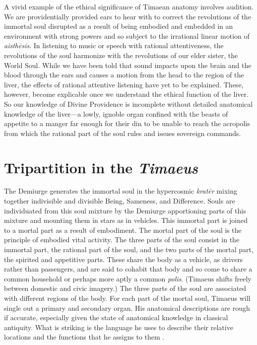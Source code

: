A vivid example of the ethical significance of Timaean anatomy involves audition. We are providentially provided ears to hear with to correct the revolutions of the immortal soul disrupted as a result of being embodied and embedded in an environment with strong powers and so subject to the irrational linear motion of \emph{aisthēsis}. In listening to music or speech with rational attentiveness, the revolutions of the soul harmonize with the revolutions of our elder sister, the World Soul. While we have been told that sound impacts upon the brain and the blood through the ears and causes a motion from the head to the region of the liver, the effects of rational attentive listening have yet to be explained. These, however, become explicable once we understand the ethical function of the liver. So our knowledge of Divine Providence is incomplete without detailed anatomical knowledge of the liver---a lowly, ignoble organ confined with the beasts of appetite to a manger far enough for their din to be unable to reach the acropolis from which the rational part of the soul rules and issues sovereign commands.


\section{Tripartition in the \emph{Timaeus}} %
\label{sec:tripartition_in_the_emph_timaeus}

The Demiurge generates the immortal soul in the hypercosmic \emph{kratēr} mixing together indivisible and divisible Being, Sameness, and Difference. Souls are individuated from this soul mixture by the Demiurge apportioning parts of this mixture and mounting them in stars as in vehicles. This immortal part is joined to a mortal part as a result of embodiment. The mortal part of the soul is the principle of embodied vital activity. The three parts of the soul consist in the immortal part, the rational part of the soul, and the two parts of the mortal part, the spirited and appetitive parts. These share the body as a vehicle, as drivers rather than passengers, and are said to cohabit that body and so come to share a common household or perhaps more aptly a common \emph{polis}. (Timaeus shifts freely between domestic and civic imagery.) The three parts of the soul are associated with different regions of the body. For each part of the mortal soul, Timaeus will single out a primary and secondary organ. His anatomical descriptions are rough if accurate, especially given the state of anatomical knowledge in classical antiquity. What is striking is the language he uses to describe their relative locations and the functions that he assigns to them \citep[for useful discussion see][]{Steel:2001ay}. 

